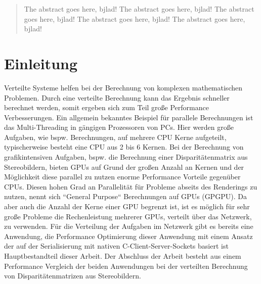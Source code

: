 \documentclass[conference]{IEEEtran}
\begin{document}




\maketitle

\begin{abstract}
The abstract goes here, bjlad!
The abstract goes here, bjlad!
The abstract goes here, bjlad!
The abstract goes here, bjlad!
The abstract goes here, bjlad!
\end{abstract}





%
\IEEEpeerreviewmaketitle



\section{Einleitung}
Verteilte Systeme helfen bei der Berechnung von komplexen mathematischen Problemen. Durch eine verteilte Berechnung kann das Ergebnis schneller berechnet werden, somit ergeben sich zum Teil große Performance Verbesserungen. Ein allgemein bekanntes Beispiel für parallele Berechnungen ist das Multi-Threading in gängigen Prozessoren von PCs. Hier werden große Aufgaben, wie bspw. Berechnungen, auf mehrere CPU Kerne aufgeteilt, typischerweise besteht eine CPU aus 2 bis 6 Kernen. Bei der Berechnung von grafikintensiven Aufgaben, bspw. die Berechnung einer Disparitätenmatrix aus Stereobildern, bieten GPUs auf Grund der großen Anzahl an Kernen und der Möglichkeit diese parallel zu nutzen enorme Performance Vorteile gegenüber CPUs. Diesen hohen Grad an Parallelität für Probleme abseits des Renderings zu nutzen, nennt sich “General Purpose“ Berechnungen auf GPUs (GPGPU). Da aber auch die Anzahl der Kerne einer GPU begrenzt ist, ist es möglich für sehr große Probleme die Rechenleistung mehrerer GPUs, verteilt über das Netzwerk, zu verwenden. Für die Verteilung der Aufgaben im Netzwerk gibt es bereits eine Anwendung, die Performance Optimierung dieser Anwendung mit einem Ansatz der auf der Serialisierung mit nativen C-Client-Server-Sockets basiert ist Hauptbestandteil dieser Arbeit. Der Abschluss der Arbeit besteht aus einem Performance Vergleich der beiden Anwendungen bei der verteilten Berechnung von Disparitätenmatrizen aus Stereobildern.
\end{document}

